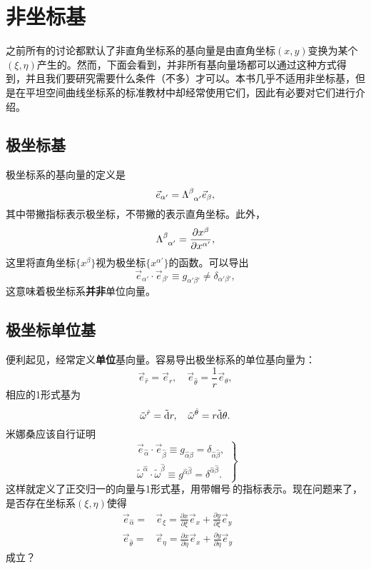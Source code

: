 \section{非坐标基}
\label{sec5.5}
之前所有的讨论都默认了非直角坐标系的基向量是由直角坐标$(x, y)$变换为某个$(\xi, \eta)$产生的。然而，下面会看到，并非所有基向量场都可以通过这种方式得到，并且我们要研究需要什么条件（不多）才可以。本书几乎不适用非坐标基，但是在平坦空间曲线坐标系的标准教材中却经常使用它们，因此有必要对它们进行介绍。

\subsection*{极坐标基}
极坐标系的基向量的定义是
\[
    \vec{e}_{\alpha'} = \Lambda\indices{^\beta_{\alpha'}} \vec{e}_{\beta},
\]
其中带撇指标表示极坐标，不带撇的表示直角坐标。此外，
\[
    \Lambda\indices{^\beta_{\alpha'}} = \frac{\partial x^\beta}{\partial x^{\alpha'}},
\]
这里将直角坐标$\{ x^\beta \}$视为极坐标$\{  x^{\alpha'} \}$的函数。可以导出
\[
    \vec{e}_{\alpha'} \cdot \vec{e}_{\beta'} \equiv g_{\alpha' \beta'} \neq \delta_{\alpha' \beta'},
\]
这意味着极坐标系\textbf{并非}单位向量。

\subsection*{极坐标单位基}
便利起见，经常定义\textbf{单位}基向量。容易导出极坐标系的单位基向量为：
\begin{equation}
    \vec{e}_{\hat{r}} = \vec{e}_{r}, \quad \vec{e}_{\hat{\theta}} = \frac{1}{r} \vec{e}_\theta,
\label{equ5.76}
\end{equation}
相应的1形式基为
\begin{equation}
    \tilde{\omega}^{\hat{r}} = \tilde{\mathrm{d}} r, \quad \tilde{\omega}^{\hat{\theta}} = r \tilde{\mathrm{d}} \theta.
\label{equ5.77}
\end{equation}
米娜桑应该自行证明
\begin{equation}
\left.
\begin{split}
    \vec{e}_{\hat{\alpha}} \cdot \vec{e}_{\hat{\beta}} \equiv g_{\hat{\alpha} \hat{\beta}} = \delta_{\hat{\alpha} \hat{\beta}}, \\
    \tilde{\omega}^{\hat{\alpha}} \cdot \tilde{\omega}^{\hat{\beta}} \equiv g^{\hat{\alpha} \hat{\beta}} = \delta^{\hat{\alpha} \hat{\beta}}.
\end{split}
\right\}
\label{equ5.78}
\end{equation}
这样就定义了正交归一的向量与1形式基，用带帽号$\hat{\ }$的指标表示。现在问题来了，是否存在坐标系$(\xi, \eta)$使得
\begin{subequations}
\begin{alignat}{2}
    \vec{e}_{\hat{\alpha}} =& \vec{e}_\xi = \frac{\partial x}{\partial \xi} \vec{e}_x + \frac{\partial y}{\partial \xi} \vec{e}_y  && \label{equ5.79a} \\
    \vec{e}_{\hat{\theta}} =& \vec{e}_\eta = \frac{\partial x}{\partial \eta} \vec{e}_x + \frac{\partial y}{\partial \eta} \vec{e}_y &&\label{equ5.79b}
\end{alignat}
\end{subequations}
成立？


